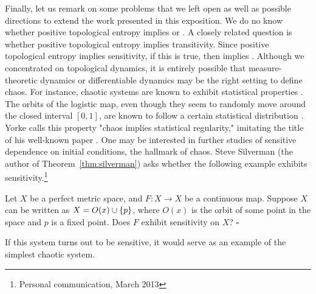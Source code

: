 \documentclass[10pt,twoside,draft]{book}
\begin{document}
Finally, let us remark on some problems that we left open as well as possible directions to extend the work presented in this exposition.
We do no know whether positive topological entropy implies \wig or \blcp.
A closely related question is whether positive topological entropy implies transitivity. 
Since positive topological entropy implies sensitivity, if this is true, then \akm implies \wig.
Although we concentrated on topological dynamics, it is entirely possible that measure-theoretic dynamics or differentiable dynamics \citep{smale} may be the right setting to define chaos.
For instance, chaotic systems are known to exhibit statistical properties \citep{lasota}.
The orbits of the logistic map, even though they seem to randomly move around the closed interval $[0,1]$, are known to follow a certain statistical distribution \citep{sternberg}.
Yorke calls this property "chaos implies statistical regularity," imitating the title of his well-known paper \citep{ueda-abraham}.
One may be interested in further studies of sensitive dependence on initial conditions, the hallmark of chaos.
Steve Silverman (the author of Theorem~\ref{thm:silverman}) asks whether the following example exhibits sensitivity.\footnote{Personal communication, March 2013}
\begin{example}
  Let $X$ be a perfect metric space, and $F: X \to X$ be a continuous map.
  Suppose $X$ can be written as $X = O(x) \cup \left \{ p \right \}$, where $O(x)$ is the orbit of some point in the space and $p$ is a fixed point.
  Does $F$ exhibit sensitivity on $X$?
  $\square$
\end{example}
If this system turns out to be sensitive, it would serve as an example of the simplest chaotic system.



\end{document}
